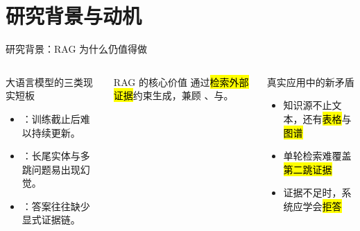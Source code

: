 \section{研究背景与动机}

\begin{frame}{研究背景：RAG 为什么仍值得做}
  \begin{columns}[T,onlytextwidth]
    \begin{block}{大语言模型的三类现实短板}
      \begin{itemize}
        \item {}：训练截止后难以持续更新。
        \item {}：长尾实体与多跳问题易出现幻觉。
        \item {}：答案往往缺少显式证据链。
      \end{itemize}
    \end{block}
    \begin{exampleblock}{RAG 的核心价值}
      通过\hl{检索外部证据}约束生成，兼顾
      、与。
    \end{exampleblock}

    \begin{alertblock}{真实应用中的新矛盾}
      \begin{itemize}
        \item 知识源不止文本，还有\hl{表格}与\hl{图谱}
        \item 单轮检索难覆盖\hl{第二跳证据}
        \item 证据不足时，系统应学会\hl{拒答}
      \end{itemize}
    \end{alertblock}
  \end{columns}
\end{frame}

